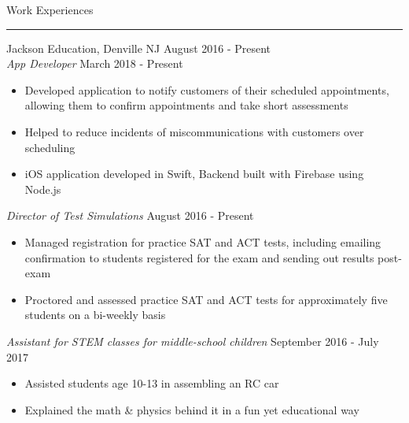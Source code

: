 \documentclass{article}
\newcommand \spacingBetweenHeadings {0.4em}
\begin{document}
\noindent
\huge Work Experiences\par
\vspace{0.1em}
\hrule
\Large
\vspace{1em}
\noindent
Jackson Education, Denville NJ
\hfill
August 2016 - Present\\
\textit{App Developer}
\hfill
March 2018 - Present\\
\vspace{-1em}
\begin{itemize}
\item Developed application to notify customers of their scheduled appointments, allowing them to \mbox{confirm} appointments and take short assessments
\item Helped to reduce incidents of miscommunications with customers over scheduling
\item iOS application developed in Swift, Backend built with Firebase using Node.js
\end{itemize}
\textit{Director of Test Simulations}
\hfill
August 2016 - Present\\
\vspace{-1em}
\begin{itemize}
\item Managed registration for practice SAT and ACT tests, including emailing confirmation to students registered for the exam and sending out results post-exam
\item Proctored and assessed practice SAT and ACT tests for approximately five students on a bi-weekly basis
\end{itemize}
\textit{Assistant for STEM classes for middle-school children}
\hfill
September 2016 - July 2017
\begin{itemize}
\item Assisted students age 10-13 in assembling an RC car
\item Explained the math \& physics behind it in a fun yet educational way
\end{itemize}
\vspace{\spacingBetweenHeadings}
\end{document}
